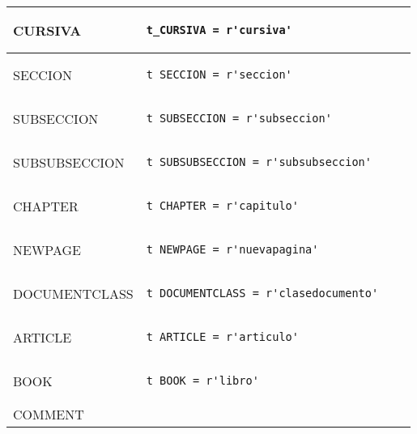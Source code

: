 \documentclass[12pt]{article}
\newcommand{\sectionbreak}{\clearpage}
\begin{document}
\begin{enumerate}
\begin{itemize}
\begin{tabular}{ |p{6cm}||p{8cm}|p{3cm}|p{3cm}|  }
            \hline CURSIVA & \begin{verbatim}t_CURSIVA = r'cursiva'\end{verbatim} \\
            \hline SECCION & \begin{verbatim}t_SECCION = r'seccion'\end{verbatim} \\
            \hline SUBSECCION & \begin{verbatim}t_SUBSECCION = r'subseccion'\end{verbatim} \\
            \hline SUBSUBSECCION & \begin{verbatim}t_SUBSUBSECCION = r'subsubseccion'\end{verbatim} \\
            \hline CHAPTER & \begin{verbatim}t_CHAPTER = r'capitulo'\end{verbatim} \\
            \hline NEWPAGE & \begin{verbatim}t_NEWPAGE = r'nuevapagina'\end{verbatim} \\
            \hline DOCUMENTCLASS & \begin{verbatim}t_DOCUMENTCLASS = r'clasedocumento'\end{verbatim} \\
            \hline ARTICLE & \begin{verbatim}t_ARTICLE = r'articulo'\end{verbatim} \\
            \hline BOOK & \begin{verbatim}t_BOOK = r'libro'\end{verbatim} \\
            \hline COMMENT & \begin{verbatim}t_COMMENT = r'%.+'\end{verbatim} \\
            \hline 
            \end{tabular}
        \end{itemize}
\end{enumerate}
\newpage
\sectionbreak
\end{document}
